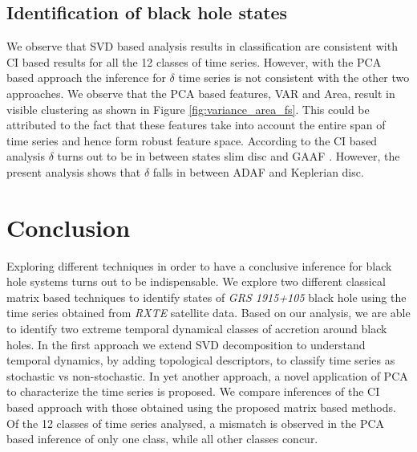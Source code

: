 \documentclass[journal]{IEEEtran}
\begin{document}
\subsection{Identification of black hole states}

We observe that SVD based analysis results in classification  are consistent with CI based results for all the 12 classes of time series. However, with the PCA based approach the inference for  $\delta$ time series is not consistent with the other two approaches. We observe that the PCA based features, VAR and Area, result in visible clustering as shown in Figure \ref{fig:variance_area_fs}. This could be attributed to the fact that   these features take into account the entire span of time series and hence form robust feature space. According to the CI based analysis $\delta$ turns out to be in between states slim disc  and GAAF \cite{Adegoke2018}. However, the present analysis shows that $\delta$ falls in between ADAF and Keplerian disc.


\section{Conclusion}
Exploring different techniques in order to have a conclusive inference for black hole systems turns out to be indispensable. We explore two different classical matrix based techniques to identify states of \textit{GRS 1915+105} black hole using the time series obtained from \textit{RXTE} satellite data. Based on our analysis, we are able to identify two extreme temporal dynamical classes of accretion around black holes. In the first approach we extend  SVD decomposition to understand temporal dynamics,  by adding  topological descriptors, to classify time series as stochastic vs non-stochastic. In yet another approach, a novel application of  PCA  to characterize the time series is proposed. We compare inferences of the CI based approach with those obtained using the proposed matrix based methods. Of the 12 classes of time series analysed, a mismatch is observed in the PCA based inference of only one class, while all other classes concur.
\end{document}

